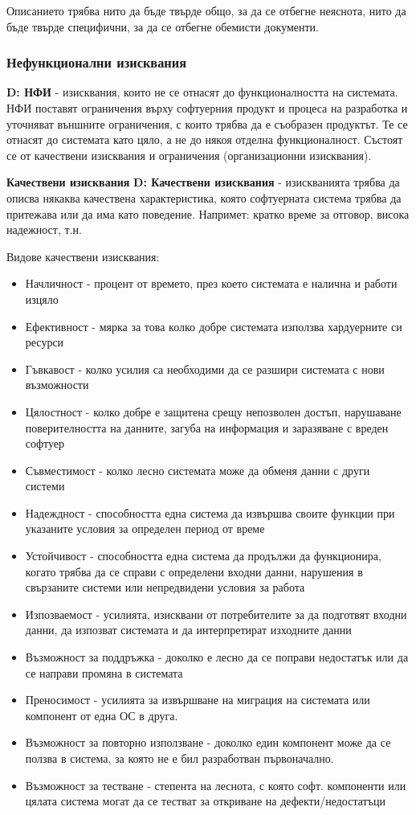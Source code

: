 \documentclass[fleqn,12pt]{article}
\begin{document}
Описанието трябва нито да бъде твърде общо, за да се отбегне неяснота, нито да бъде твърде специфични, за да се отбегне обемисти документи.


\subsubsection{Нефункционални изисквания}
\textbf{D: НФИ} - изисквания, които не се отнасят до функционалността на системата. НФИ поставят ограничения върху софтуерния продукт и процеса на разработка и уточняват външните ограничения, с които трябва да е съобразен продуктът. Те се отнасят до системата като цяло, а не до някоя отделна функционалност. Състоят се от качествени изисквания и ограничения (организационни изисквания).

\bigbreak
\textbf{Качествени изисквания}
\bigbreak
\textbf{D: Качествени изисквания} - изискванията трябва да описва някаква качествена характеристика, която софтуерната система трябва да притежава или да има като поведение. Напримет: кратко време за отговор, висока надежност, т.н.

Видове качествени изисквания:
\begin{itemize}
	\item Начличност - процент от времето, през което системата е налична и работи изцяло
	\item Ефективност - мярка за това колко добре системата използва хардуерните си ресурси
	\item Гъвкавост - колко усилия са необходими да се разшири системата с нови възможности
	\item Цялостност -  колко добре е защитена срещу непозволен достъп, нарушаване поверителността на данните, загуба на информация и заразяване с вреден софтуер
	\item Съвместимост - колко лесно системата може да обменя данни с други системи
	\item Надеждност - способността една система да извършва своите функции при указаните условия за определен период от време
	\item Устойчивост - способността една система да продължи да функционира, когато трябва да се справи с определени входни данни, нарушения в свързаните системи или непредвидени условия за работа
	\item Изпозваемост - усилията, изисквани от потребителите за да подготвят входни данни, да изпозват системата и да интерпретират изходните данни
	\item Възможност за поддръжка - доколко е лесно да се поправи недостатък или да се направи промяна в системата
	\item Преносимост - усилията за извършване на миграция на системата или компонент от една ОС в друга.
	\item Възможност за повторно използване - доколко един компонент може да се ползва в система, за която не е бил разработван първоначално.
	\item Възможност за тестване - степента на леснота, с която софт. компоненти или цялата система могат да се тестват за откриване на дефекти/недостатъци
\end{itemize}
\end{document}
